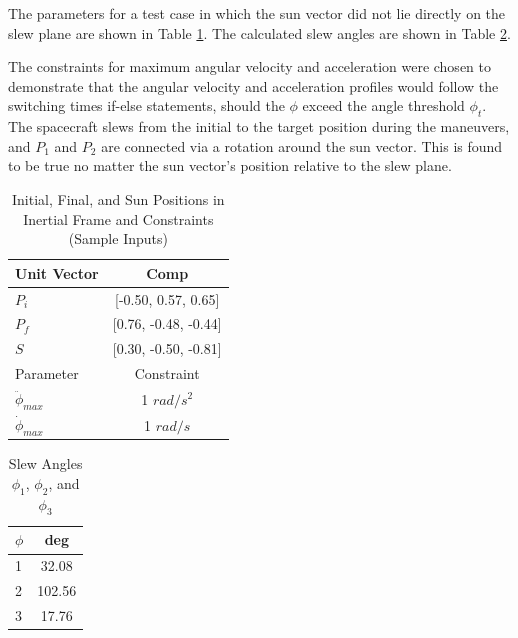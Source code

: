 \documentclass[letterpaper, preprint, paper,11pt]{AAS}	%
\begin{document}
The parameters for a test case in which the sun vector did not lie directly on the slew plane are shown in Table \ref{tab:alphaNot0_PiPfS_AWmax}. The calculated slew angles are shown in Table \ref{tab:alphaNot0_phi_123}. 

The constraints for maximum angular velocity and acceleration were chosen to demonstrate that the angular velocity and acceleration profiles would follow the switching times if-else statements, should the $\phi$ exceed the angle threshold $\phi_{t}$. The spacecraft slews from the initial to the target position during the maneuvers, and $P_1$ and $P_2$ are connected via a rotation around the sun vector. This is found to be true no matter the sun vector's position relative to the slew plane. 



\begin{multicols}{2}
	\begin{table}[H]
		\centering
		\caption{Initial, Final, and Sun Positions in Inertial Frame and Constraints (Sample Inputs)}
		\begin{tabular}{lc}
			\toprule
			\midrule
			Unit Vector & Comp \\
			\midrule
			$P_i$ & [-0.50, 0.57, 0.65] \\
			$P_f$ & [0.76, -0.48, -0.44] \\ 
			$S$ & [0.30, -0.50, -0.81] \\
			\midrule
			\midrule
			Parameter & Constraint \\ 
			\midrule
			$\ddot{\phi}_{max}$ & 1 $rad/s^2$ \\
			$\dot{\phi}_{max}$ & 1 $rad/s$ \\ 
			\midrule
			\bottomrule
		\end{tabular}%
		\label{tab:alphaNot0_PiPfS_AWmax}%
	\end{table}
	\columnbreak
	\begin{table}[H]
		\centering
		\caption{Slew Angles $\phi_1$, $\phi_2$, and $\phi_3$}
		\begin{tabular}{lc}
			\toprule
			\midrule
			$\phi$ & deg \\
			\midrule
			1 & 32.08 \\
			2 & 102.56 \\ 
			3 & 17.76 \\
			\midrule
			\bottomrule
		\end{tabular}%
		\label{tab:alphaNot0_phi_123}%
	\end{table}%
\end{multicols}
\end{document}
